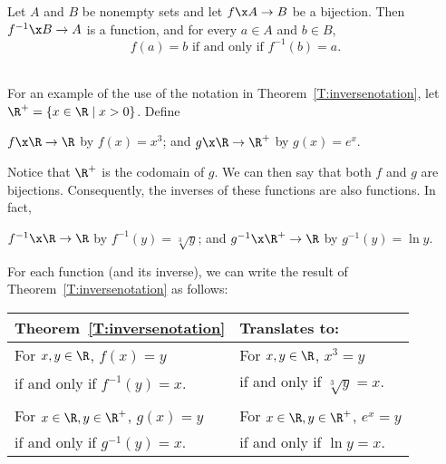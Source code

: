\begin{theorem}  \label{T:inversenotation}
Let  $A$  and  $B$  be nonempty sets and let  $f\x A \to B$  be a bijection.  Then 
$f^{ - 1} \x B \to A$ is a function, and for every  $a \in A$ and $b \in B$,
\[
f( a ) = b  \text{ if and only if } f^{ - 1} ( b ) = a.
\]
\end{theorem}
%
%
\begin{example} \hfill \\
\label{exam:inversenotation}%
For an example of the use of the notation in Theorem~\ref{T:inversenotation}, let  $\R^ +   = \left\{ { {x \in \R} \mid x > 0} \right\}$.  Define

\begin{center}
$f\x \R \to \R$  by  $f( x ) = x^3$; and $g\x \R \to \R^ +  $  by  $g( x ) = e^x $.
\end{center}
\vskip10pt
Notice that  $\R^+ $ is the codomain of  $g$.  We can then say that both  $f$  and  $g$  are bijections.  Consequently, the inverses of these functions are also functions.  In fact,
\begin{center}
$f^{ - 1} \x \R \to \R$  by  $f^{ - 1} ( y ) = \sqrt[3]{y}$; and $g^{ - 1} \x \R^ +   \to \R$  by  $g^{ - 1} ( y ) = \ln y$.
\end{center}
%
%
%
%
\vskip10pt
For each function (and its inverse), we can write the result of Theorem~\ref{T:inversenotation} as follows:
\begin{center}
\begin{tabular}{l | l}
\textbf{Theorem~\ref{T:inversenotation}}   &  \textbf{Translates to:}  \\ \hline
For  $x, y \in \R$,  $f( x ) = y$  &  For  $x, y \in \R$,  $x^3  = y$ \\
if and only if  $f^{ - 1} ( y ) = x$.  &  if and only if $\sqrt[3]{y} = x$.  \\
  &  \\
For  $x \in \R, y \in \R^ +  $,  $g( x ) = y$  &  For  
$x \in \R, y \in \R^ +  $,  $e^x  = y$ \\
if and only if  $g^{ - 1} ( y ) = x$.  &  if and only if  $\ln y = x$.  \\
\end{tabular}
\end{center}
\end{example}
%
\hbreak

\endinput
